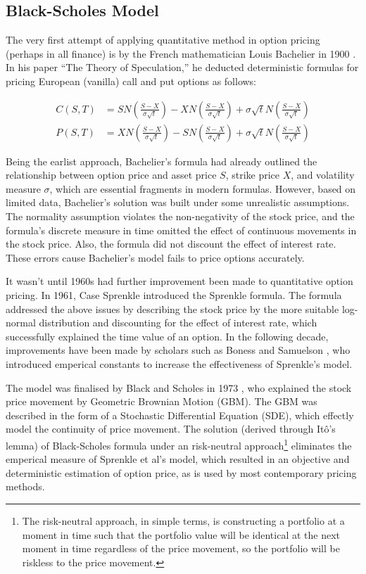 \subsection{Black-Scholes Model}

The very first attempt of applying quantitative method in option pricing (perhaps in all finance) is by the French mathematician Louis Bachelier in 1900 \cite{Bachelier1900}. In his paper ``The Theory of Speculation,'' he deducted deterministic formulas for pricing European (vanilla) call and put options as follows:

\begin{align}
C(S, T) &= SN(\frac{S - X}{\sigma\sqrt{t}}) - XN(\frac{S - X}{\sigma \sqrt{t}}) + \sigma\sqrt{t}N(\frac{S - X}{\sigma \sqrt{t}}) \\
P(S, T) &= XN(\frac{S - X}{\sigma \sqrt{t}}) - SN(\frac{S - X}{\sigma \sqrt{t}}) + \sigma\sqrt{t}N(\frac{S - X}{\sigma \sqrt{t}})
\end{align}

Being the earlist approach, Bachelier's formula had already outlined the relationship between option price and asset price $S$, strike price $X$, and volatility measure $\sigma$, which are essential fragments in modern formulas. However, based on limited data, Bachelier's solution was built under some unrealistic assumptions. The normality assumption violates the non-negativity of the stock price, and the formula's discrete measure in time omitted the effect of continuous movements in the stock price. Also, the formula did not discount the effect of interest rate. These errors cause Bachelier's model fails to price options accurately.

It wasn't until 1960s had further improvement been made to quantitative option pricing. In 1961, Case Sprenkle \cite{Sprenkle1961} introduced the Sprenkle formula. The formula addressed the above issues by describing the stock price by the more suitable log-normal distribution and discounting for the effect of interest rate, which successfully explained the time value of an option. In the following decade, improvements have been made by scholars such as Boness and Samuelson \cite{BS1973}, who introduced emperical constants to increase the effectiveness of Sprenkle's model.

The model was finalised by Black and Scholes in 1973 \cite{BS1973}, who explained the stock price movement by Geometric Brownian Motion (GBM). The GBM was described in the form of a Stochastic Differential Equation (SDE), which effectly model the continuity of price movement. The solution (derived through Itô's lemma) of Black-Scholes formula under an risk-neutral approach\footnote{The risk-neutral approach, in simple terms, is constructing a portfolio at a moment in time such that the portfolio value will be identical at the next moment in time regardless of the price movement, so the portfolio will be riskless to the price movement.} eliminates the emperical measure of Sprenkle et al's model, which resulted in an objective and deterministic estimation of option price, as is used by most contemporary pricing methods.

